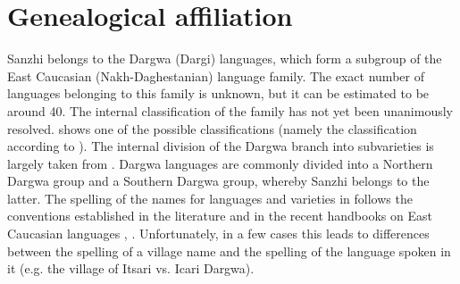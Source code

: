 
\section{Genealogical affiliation}
\label{sec:Genealogical affiliation}

Sanzhi belongs to the Dargwa (Dargi) languages, which form a subgroup of the East Caucasian (Nakh-Daghestanian) language family. The exact number of languages belonging to this family is unknown, but it can be estimated to be around 40. The internal classification of the family has not yet been unanimously resolved.  shows one of the possible classifications (namely the classification according to \citet[xi]{Kibrik1996}). The internal division of the Dargwa branch into subvarieties is largely taken from \citet{Korjakov2006}. Dargwa languages are commonly divided into a Northern Dargwa group and a Southern Dargwa group, whereby Sanzhi belongs to the latter. The spelling of the names for languages and varieties in   follows the conventions established in the literature and in the recent handbooks on East Caucasian languages \citep{PolinskyInPress}, \citep{KoryakovEtAllInPreparation}. Unfortunately, in a few cases this leads to differences between the spelling of a village name and the spelling of the language spoken in it (e.g. the village of Itsari vs. Icari Dargwa).
%
